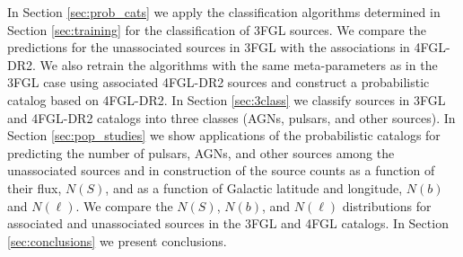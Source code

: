 In Section \ref{sec:prob_cats} we apply the classification algorithms determined in Section \ref{sec:training} for the classification of 3FGL sources.
We compare the predictions for the unassociated sources in 3FGL with the associations in 4FGL-DR2.
We also retrain the algorithms with the same meta-parameters as in the 3FGL case using associated 4FGL-DR2 sources and construct
a probabilistic catalog based on 4FGL-DR2.
In Section \ref{sec:3class} we classify sources in 3FGL and 4FGL-DR2 catalogs into three classes (AGNs, pulsars, and other sources).
In Section \ref{sec:pop_studies} we show applications of the probabilistic catalogs for predicting the number of pulsars, AGNs, and other sources among the unassociated sources and in construction of the source counts as a function of their flux, $N(S)$, and as a function of 
Galactic latitude and longitude, $N(b)$ and $N(\ell)$.
We compare the $N(S)$, $N(b)$, and $N(\ell)$ distributions for associated and unassociated sources in the 3FGL and 4FGL catalogs.
In Section \ref{sec:conclusions} we present conclusions.


